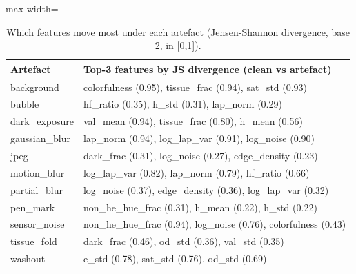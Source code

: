 \begin{table}[H]\centering\small
\caption{Which features move most under each artefact (Jensen-Shannon divergence, base 2, in [0,1]).}\label{tab:js}
\begin{adjustbox}{max width=\linewidth}\begin{tabular}{lp{11cm}}\toprule
\textbf{Artefact} & \textbf{Top-3 features by JS divergence (clean vs artefact)} \\\midrule
background & colorfulness (0.95), tissue\_frac (0.94), sat\_std (0.93) \\
bubble & hf\_ratio (0.35), h\_std (0.31), lap\_norm (0.29) \\
dark\_exposure & val\_mean (0.94), tissue\_frac (0.80), h\_mean (0.56) \\
gaussian\_blur & lap\_norm (0.94), log\_lap\_var (0.91), log\_noise (0.90) \\
jpeg & dark\_frac (0.31), log\_noise (0.27), edge\_density (0.23) \\
motion\_blur & log\_lap\_var (0.82), lap\_norm (0.79), hf\_ratio (0.66) \\
partial\_blur & log\_noise (0.37), edge\_density (0.36), log\_lap\_var (0.32) \\
pen\_mark & non\_he\_hue\_frac (0.31), h\_mean (0.22), h\_std (0.22) \\
sensor\_noise & non\_he\_hue\_frac (0.94), log\_noise (0.76), colorfulness (0.43) \\
tissue\_fold & dark\_frac (0.46), od\_std (0.36), val\_std (0.35) \\
washout & e\_std (0.78), sat\_std (0.76), od\_std (0.69) \\
\bottomrule\end{tabular}\end{adjustbox}\end{table}